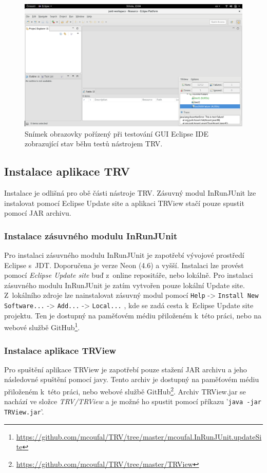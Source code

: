   \begin{figure}
    \includegraphics[width=\textwidth, center]{obrazky-figures/TRV_screenshot.png}
    \caption{Snímek obrazovky pořízený při testování GUI Eclipse IDE zobrazující stav běhu testů nástrojem TRV.}
    \label{fig:TRV_screenshot}
  \end{figure}

      \subsection{Instalace aplikace TRV}
      Instalace je odlišná pro obě části nástroje TRV. Zásuvný modul InRunJUnit lze instalovat pomocí Eclipse Update site a aplikaci TRView stačí pouze spustit pomocí JAR archivu.

      \subsubsection{Instalace zásuvného modulu InRunJUnit}
      Pro instalaci zásuvného modulu InRunJUnit je zapotřebí vývojové prostředí Eclipse s~JDT. Doporučena je verze Neon (4.6) a vyšší. Instalaci lze provést pomocí \emph{Eclipse Update site} buď z~online repositáře, nebo lokálně. Pro instalaci zásuvného modulu InRunJUnit je zatím vytvořen pouze lokální Update site. Z~lokálního zdroje lze nainstalovat zásuvný modul pomocí \texttt{Help} -> \texttt{Install New Software...} -> \texttt{Add...} -> \texttt{Local...} , kde se zadá cesta k~Eclipse Update site projektu. Ten je dostupný na paměťovém médiu přiloženém k~této práci, nebo na webové službě GitHub\footnote{\url{https://github.com/mcoufal/TRV/tree/master/mcoufal.InRunJUnit.updateSite}}.

      \subsubsection{Instalace aplikace TRView}
      Pro spuštění aplikace TRView je zapotřebí pouze stažení JAR archivu a jeho následovné spuštění pomocí javy. Tento archiv je dostupný na paměťovém médiu přiloženém k~této práci, nebo webové službě GitHub\footnote{\url{https://github.com/mcoufal/TRV/tree/master/TRView}}. Archiv TRView.jar se nachází ve složce \emph{TRV/TRView} a je možné ho spustit pomocí příkazu '\texttt{java -jar TRView.jar}'.

